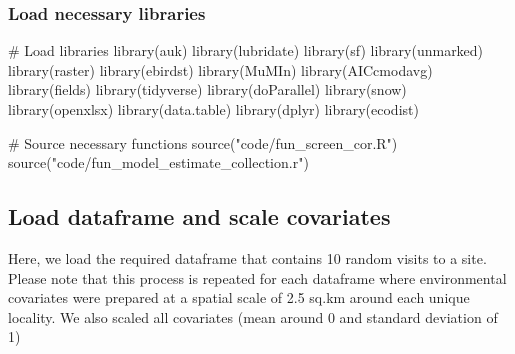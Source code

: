 \documentclass[]{article}
\newenvironment{Shaded}{}{}
\newcommand{\CommentTok}[1]{\textcolor[rgb]{0.00,0.50,0.00}{#1}}
\newcommand{\KeywordTok}[1]{\textcolor[rgb]{0.00,0.00,1.00}{#1}}
\newcommand{\NormalTok}[1]{#1}
\newcommand{\StringTok}[1]{\textcolor[rgb]{0.00,0.50,0.50}{#1}}
\begin{document}
\hypertarget{load-necessary-libraries}{%
\subsubsection{Load necessary libraries}\label{load-necessary-libraries}}

\begin{Shaded}
\begin{Highlighting}[]
\CommentTok{# Load libraries}
\KeywordTok{library}\NormalTok{(auk)}
\KeywordTok{library}\NormalTok{(lubridate)}
\KeywordTok{library}\NormalTok{(sf)}
\KeywordTok{library}\NormalTok{(unmarked)}
\KeywordTok{library}\NormalTok{(raster)}
\KeywordTok{library}\NormalTok{(ebirdst)}
\KeywordTok{library}\NormalTok{(MuMIn)}
\KeywordTok{library}\NormalTok{(AICcmodavg)}
\KeywordTok{library}\NormalTok{(fields)}
\KeywordTok{library}\NormalTok{(tidyverse)}
\KeywordTok{library}\NormalTok{(doParallel)}
\KeywordTok{library}\NormalTok{(snow)}
\KeywordTok{library}\NormalTok{(openxlsx)}
\KeywordTok{library}\NormalTok{(data.table)}
\KeywordTok{library}\NormalTok{(dplyr)}
\KeywordTok{library}\NormalTok{(ecodist)}

\CommentTok{# Source necessary functions}
\KeywordTok{source}\NormalTok{(}\StringTok{"code/fun_screen_cor.R"}\NormalTok{)}
\KeywordTok{source}\NormalTok{(}\StringTok{"code/fun_model_estimate_collection.r"}\NormalTok{)}
\end{Highlighting}
\end{Shaded}

\hypertarget{load-dataframe-and-scale-covariates}{%
\subsection{Load dataframe and scale covariates}\label{load-dataframe-and-scale-covariates}}

Here, we load the required dataframe that contains 10 random visits to a site. Please note that this process is repeated for each dataframe where environmental covariates were prepared at a spatial scale of 2.5 sq.km around each unique locality. We also scaled all covariates (mean around 0 and standard deviation of 1)
\end{document}
